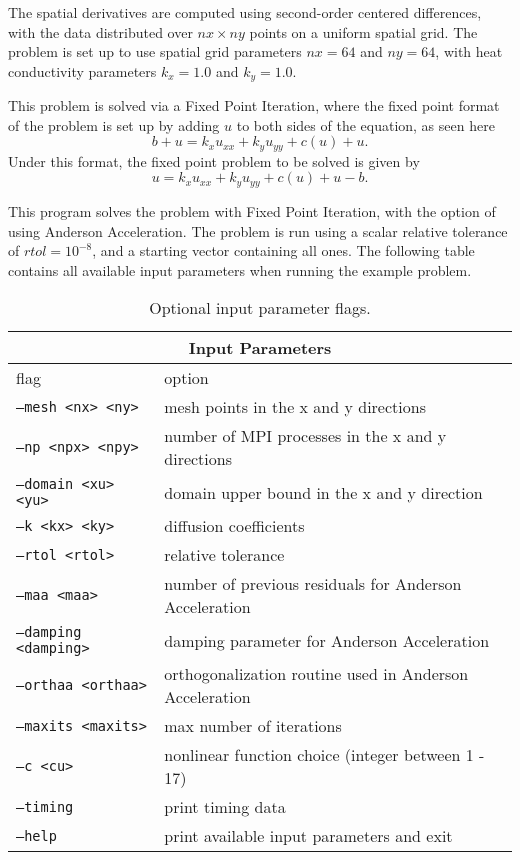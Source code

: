 The spatial derivatives are computed using second-order centered
differences, with the data distributed over $nx\times ny$ points
on a uniform spatial grid.  
The problem is set up to use spatial grid parameters $nx=64$ and
$ny=64$, with heat conductivity parameters $k_x=1.0$ and
$k_y=1.0$.  

This problem is solved via a Fixed Point Iteration, where the fixed point format
of the problem is set up by adding $u$ to both sides of the equation, as
seen here
\begin{equation}
    b + u = k_x u_{xx} + k_y u_{yy} + c(u) + u.
\end{equation}
Under this format, the fixed point problem to be solved is given by
\begin{equation}
    u = k_x u_{xx} + k_y u_{yy} + c(u) + u - b.
\end{equation}

This program solves the problem with Fixed Point Iteration, 
with the option of using Anderson Acceleration.
The problem is run using a scalar relative
tolerance of $rtol=10^{-8}$, and a starting vector
containing all ones. 
The following table contains all available input parameters
when running the example problem.

\begin{center}
\begin{table}
\begin{tabular}{ |p{5cm}||p{10cm}| }
\hline
\multicolumn{2}{|c|}{Input Parameters} \\
\hline
flag & option \\
\hline
{\tt --mesh <nx> <ny>} & mesh points in the x and y directions\\
{\tt --np <npx> <npy>} & number of MPI processes in the x and y directions\\
{\tt --domain <xu> <yu>} & domain upper bound in the x and y direction\\
{\tt --k <kx> <ky>} & diffusion coefficients\\
{\tt --rtol <rtol>} & relative tolerance\\
{\tt --maa <maa>} & number of previous residuals for Anderson Acceleration \\
{\tt --damping <damping>} & damping parameter for Anderson Acceleration \\
{\tt --orthaa <orthaa>} & orthogonalization routine used in Anderson Acceleration \\
{\tt --maxits <maxits>} & max number of iterations \\
{\tt --c <cu>} & nonlinear function choice (integer between 1 - 17)\\
{\tt --timing} & print timing data\\
{\tt --help} & print available input parameters and exit\\
\hline
\end{tabular}\label{tab:input_params}
\caption{Optional input parameter flags.}
\end{table}
\end{center}

